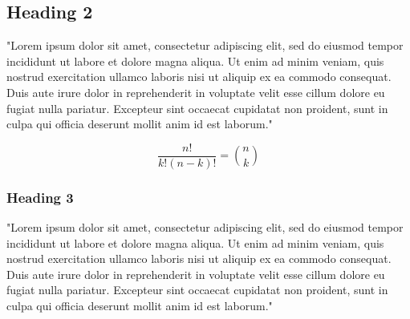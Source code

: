 \documentclass[a4paper,11pt]{article}
\begin{document}
\subsection{Heading 2}
"Lorem ipsum dolor sit amet, consectetur adipiscing elit, sed do eiusmod tempor
incididunt ut labore et dolore magna aliqua. Ut enim ad minim veniam, quis
nostrud exercitation ullamco laboris nisi ut aliquip ex ea commodo consequat.
Duis aute irure dolor in reprehenderit in voluptate velit esse cillum dolore eu
fugiat nulla pariatur. Excepteur sint occaecat cupidatat non proident, sunt in
culpa qui officia deserunt mollit anim id est laborum."

$$
\frac{n!}{k!(n-k)!} = \binom{n}{k}
$$

\subsubsection{Heading 3}
"Lorem ipsum dolor sit amet, consectetur adipiscing elit, sed do eiusmod tempor
incididunt ut labore et dolore magna aliqua. Ut enim ad minim veniam, quis
nostrud exercitation ullamco laboris nisi ut aliquip ex ea commodo consequat.
Duis aute irure dolor in reprehenderit in voluptate velit esse cillum dolore eu
fugiat nulla pariatur. Excepteur sint occaecat cupidatat non proident, sunt in
culpa qui officia deserunt mollit anim id est laborum."

%
%
\end{document}
